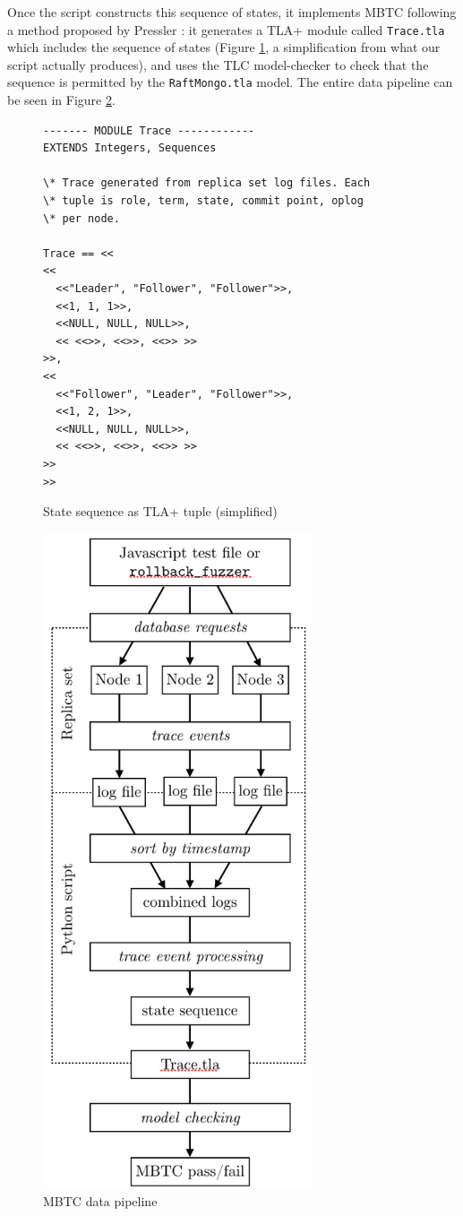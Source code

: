 \documentclass{vldb}
\begin{document}
Once the script constructs this sequence of states, it implements MBTC following a method proposed by Pressler \cite{Pressler18VerifyingSoftwareTracesTLAPlus}: it generates a TLA+ module called \texttt{Trace.tla} which includes the sequence of states (Figure \ref{fig:state-sequence}, a simplification from what our script actually produces), and uses the TLC model-checker to check that the sequence is permitted by the \texttt{RaftMongo.tla} model. The entire data pipeline can be seen in Figure \ref{figure:MBTC-pipline}.

\begin{figure}
\begin{verbatim}
------- MODULE Trace ------------
EXTENDS Integers, Sequences

\* Trace generated from replica set log files. Each
\* tuple is role, term, state, commit point, oplog
\* per node.

Trace == <<
<<
  <<"Leader", "Follower", "Follower">>,
  <<1, 1, 1>>,
  <<NULL, NULL, NULL>>,
  << <<>>, <<>>, <<>> >>
>>,
<<
  <<"Follower", "Leader", "Follower">>,
  <<1, 2, 1>>,
  <<NULL, NULL, NULL>>,
  << <<>>, <<>>, <<>> >>
>>
>>
\end{verbatim}
\caption{State sequence as TLA+ tuple (simplified)}
\label{fig:state-sequence}
\end{figure}

\begin{figure}
\includegraphics[width=8cm]{MBTC-pipeline.png}
\caption{MBTC data pipeline}
\label{figure:MBTC-pipline}
\end{figure}
\end{document}
